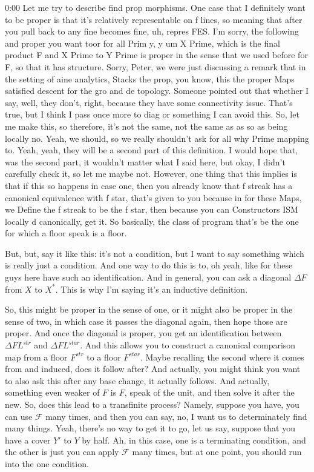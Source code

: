 \begin{unfinished}{0:00}
Let me try to describe find prop morphisms. One case that I definitely want to be proper is that it's relatively representable on f lines, so meaning that after you pull back to any fine becomes fine, uh, repres FES. I'm sorry, the following and proper you want toor for all Prim y, y um X Prime, which is the final product F and X Prime to Y Prime is proper in the sense that we used before for F, so that it has structure. Sorry, Peter, we were just discussing a remark that in the setting of aine analytics, Stacks the prop, you know, this the proper Maps satisfied descent for the gro and de topology. Someone pointed out that whether I say, well, they don't, right, because they have some connectivity issue. That's true, but I think I pass once more to diag or something I can avoid this. So, let me make this, so therefore, it's not the same, not the same as as so as being locally no. Yeah, we should, so we really shouldn't ask for all why Prime mapping to. Yeah, yeah, they will be a second part of this definition. I would hope that, was the second part, it wouldn't matter what I said here, but okay, I didn't carefully check it, so let me maybe not. However, one thing that this implies is that if this so happens in case one, then you already know that f streak has a canonical equivalence with f star, that's given to you because in for these Maps, we Define the f streak to be the f star, then because you can Constructors ISM locally d canonically, get it. So basically, the class of program that's be the one for which a floor speak is a floor.

But, but, say it like this: it's not a condition, but I want to say something which is really just a condition. And one way to do this is to, oh yeah, like for these guys here have such an identification. And in general, you can ask a diagonal $\Delta F$ from $X$ to $X^*$. This is why I'm saying it's an inductive definition.

So, this might be proper in the sense of one, or it might also be proper in the sense of two, in which case it passes the diagonal again, then hope those are proper. And once the diagonal is proper, you get an identification between $\Delta FL^{str}$ and $\Delta FL^{star}$. And this allows you to construct a canonical comparison map from a floor $F^{str}$ to a floor $F^{star}$. Maybe recalling the second where it comes from and induced, does it follow after? And actually, you might think you want to also ask this after any base change, it actually follows. And actually, something even weaker of $F$ is $F$, speak of the unit, and then solve it after the new. So, does this lead to a transfinite process? Namely, suppose you have, you can use $\mathcal{F}$ many times, and then you can say, no, I want us to determinately find many things. Yeah, there's no way to get it to go, let us say, suppose that you have a cover $Y'$ to $Y$ by half. Ah, in this case, one is a terminating condition, and the other is just you can apply $\mathcal{F}$ many times, but at one point, you should run into the one condition.


\end{unfinished}
